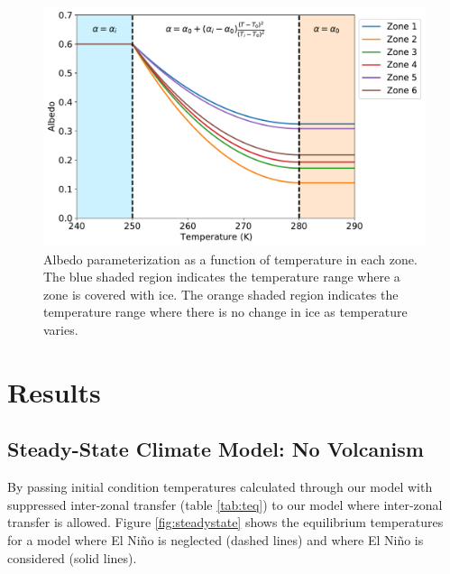 \documentclass[12pt]{article}
\begin{document}
\begin{figure}[H]
    \centering
    \includegraphics[scale=0.6]{albedo.pdf}
    \caption{
        Albedo parameterization as a function of temperature in each zone.
        The blue shaded region indicates the temperature range where a zone
        is covered with ice. The orange shaded region indicates the temperature
        range where there is no change in ice as temperature varies.
    }
    \label{fig:albedotemp}
\end{figure}
\FloatBarrier

\section{Results}
\label{section:results}

\subsection{Steady-State Climate Model: No Volcanism}
By passing initial condition temperatures calculated through our model with
suppressed inter-zonal transfer (table \ref{tab:teq}) to  our  model  where 
inter-zonal  transfer  is allowed. Figure \ref{fig:steadystate} shows the
equilibrium temperatures for a model where El Niño is neglected (dashed lines)
and where El Niño is considered (solid lines).
\end{document}
